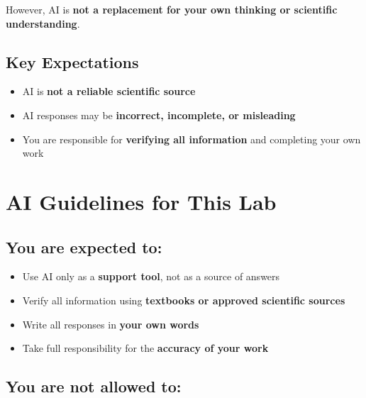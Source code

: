 \documentclass[
  letterpaper,
  DIV=11,
  numbers=noendperiod]{scrreprt}
\begin{document}
However, AI is \textbf{not a replacement for your own thinking or
scientific understanding}.

\subsection*{\texorpdfstring{\textbf{Key
Expectations}}{Key Expectations}}\label{key-expectations}

\begin{itemize}
\item
  AI is \textbf{not a reliable scientific source}
\item
  AI responses may be \textbf{incorrect, incomplete, or misleading}
\item
  You are responsible for \textbf{verifying all information} and
  completing your own work
\end{itemize}

\section*{\texorpdfstring{\textbf{AI Guidelines for This
Lab}}{AI Guidelines for This Lab}}\label{ai-guidelines-for-this-lab}


\subsection*{\texorpdfstring{\textbf{You are expected
to:}}{You are expected to:}}\label{you-are-expected-to}

\begin{itemize}
\item
  Use AI only as a \textbf{support tool}, not as a source of answers
\item
  Verify all information using \textbf{textbooks or approved scientific
  sources}
\item
  Write all responses in \textbf{your own words}
\item
  Take full responsibility for the \textbf{accuracy of your work}
\end{itemize}

\subsection*{\texorpdfstring{\textbf{You are not allowed
to:}}{You are not allowed to:}}\label{you-are-not-allowed-to}
\end{document}
